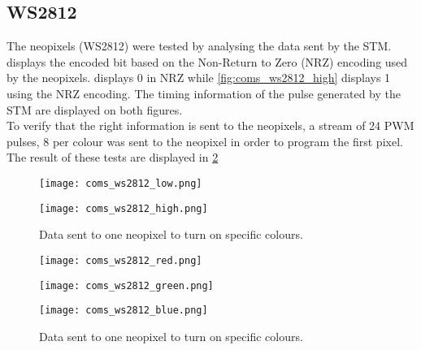 \subsection{WS2812}
The neopixels (WS2812) were tested by analysing the data sent by the STM.  displays the encoded bit based on the Non-Return to Zero (NRZ) encoding used by the neopixels.  displays 0 in NRZ while \cref{fig:coms_ws2812_high} displays 1 using the NRZ encoding. The timing information of the pulse generated by the STM are displayed on both figures.\\
To verify that the right information is sent to the neopixels, a stream of 24 PWM pulses, 8 per colour was sent to the neopixel in order to program the first pixel. The result of these tests are displayed in \ref{fig:coms_ws2812_colour}
\begin{figure}[h!]
	\centering
	\begin{minipage}[b]{\textwidth}
		\centering
		\texttt{[image: coms\_ws2812\_low.png]}
		\label{fig:coms_ws2812_low}
	\end{minipage}
	\begin{minipage}[b]{\textwidth}
		\centering
		\texttt{[image: coms\_ws2812\_high.png]}
		\label{fig:coms_ws2812_high}
	\end{minipage}    
	\caption{Data sent to one neopixel to turn on specific colours.}
	\label{fig:coms_ws2812_data}
\end{figure}
\begin{figure}[h!]
	\centering
	\begin{minipage}[b]{\textwidth}
		\centering
		\texttt{[image: coms\_ws2812\_red.png]}
		\label{fig:coms_ws2812_red}
	\end{minipage}
	\begin{minipage}[b]{\textwidth}
		\centering
		\texttt{[image: coms\_ws2812\_green.png]}
		\label{fig:coms_ws2812_green}
	\end{minipage}
	\begin{minipage}[b]{\textwidth}
		\centering
		\texttt{[image: coms\_ws2812\_blue.png]}
		\label{fig:coms_ws2812_blue}
	\end{minipage}    
	\caption{Data sent to one neopixel to turn on specific colours.}
	\label{fig:coms_ws2812_colour}
\end{figure}


